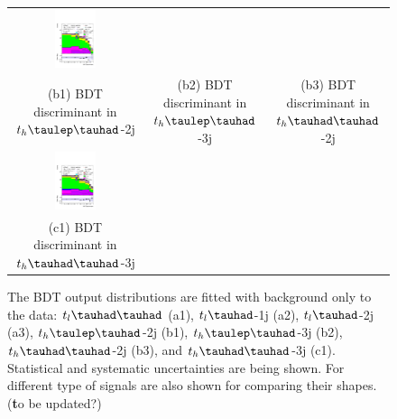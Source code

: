 \begin{figure}[H]
\begin{tabular}{@{}ccc@{}}
  \includegraphics[width=0.33\textwidth]{figures/reg2mtau1b2jos_vetobtagwp70_highmet_pre_bonly.pdf}\\
(b1) BDT discriminant in $t_h\tlhad$-2j & (b2) BDT discriminant in  $t_h\tlhad$-3j & (b3) BDT discriminant in $t_h\thadhad$-2j \\
  \includegraphics[width=0.33\textwidth]{figures/reg2mtau1b3jos_vetobtagwp70_highmet_pre_bonly.pdf}& \\
(c1) BDT discriminant in$t_h\thadhad$-3j\\
\end{tabular}
\caption{ The BDT output distributions are fitted with background only to the data: $t_l\thadhad$ (a1),  $t_l\tauhad$-1j (a2),  $t_l\tauhad$-2j (a3),
  $t_h\tlhad$-2j (b1), $t_h\tlhad$-3j (b2), $t_h\thadhad$-2j (b3), and $t_h\thadhad$-3j (c1).
  Statistical and systematic uncertainties are being shown. For different type of signals are also shown for comparing their shapes. ({\textbf to be updated?})}
\label{fig:Bonlyfit_data}
\end{figure}


